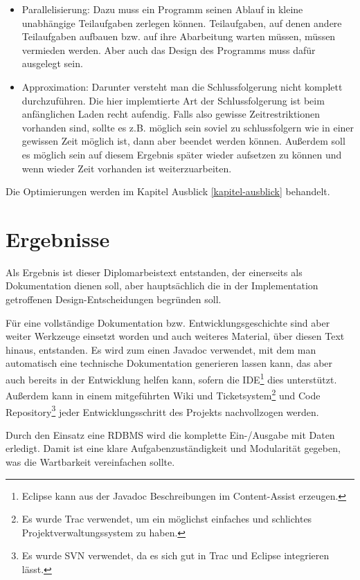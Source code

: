 \begin{itemize}
  \item Parallelisierung: Dazu muss ein Programm seinen Ablauf in kleine unabhängige Teilaufgaben zerlegen können. Teilaufgaben, auf denen andere Teilaufgaben aufbauen bzw. auf ihre Abarbeitung warten müssen, müssen vermieden werden. Aber auch das Design des Programms muss dafür ausgelegt sein.
  \item Approximation: Darunter versteht man die Schlussfolgerung nicht komplett durchzuführen. Die hier implemtierte Art der Schlussfolgerung ist beim anfänglichen Laden recht aufendig. Falls also gewisse Zeitrestriktionen vorhanden sind, sollte es z.B. möglich sein soviel zu schlussfolgern wie in einer gewissen Zeit möglich ist, dann aber beendet werden können. Außerdem soll es möglich sein auf diesem Ergebnis später wieder aufsetzen zu können und wenn wieder Zeit vorhanden ist weiterzuarbeiten.
\end{itemize}

Die Optimierungen werden im Kapitel Ausblick \ref{kapitel-ausblick} behandelt.

\section{Ergebnisse}
Als Ergebnis ist dieser Diplomarbeistext entstanden, der einerseits als Dokumentation dienen soll, aber hauptsächlich die in der Implementation getroffenen Design-Entscheidungen begründen soll.

Für eine vollständige Dokumentation bzw. Entwicklungsgeschichte sind aber weiter Werkzeuge einsetzt worden und auch weiteres Material, über diesen Text hinaus, entstanden. Es wird zum einen Javadoc verwendet, mit dem man automatisch eine technische Dokumentation generieren lassen kann, das aber auch bereits in der Entwicklung helfen kann, sofern die IDE\footnote{Eclipse kann aus der Javadoc Beschreibungen im Content-Assist erzeugen.} dies unterstützt. Außerdem kann in einem mitgeführten Wiki und Ticketsystem\footnote{Es wurde Trac verwendet, um ein möglichst einfaches und schlichtes Projektverwaltungssystem zu haben.} und Code Repository\footnote{Es wurde SVN verwendet, da es sich gut in Trac und Eclipse integrieren lässt.} jeder Entwicklungsschritt des Projekts nachvollzogen werden.

Durch den Einsatz eine RDBMS wird die komplette Ein-/Ausgabe mit Daten erledigt. Damit ist eine klare Aufgabenzuständigkeit und Modularität gegeben, was die Wartbarkeit vereinfachen sollte. 

